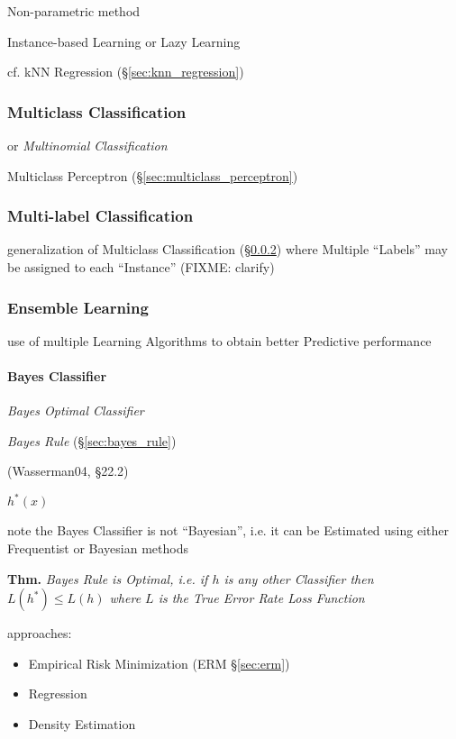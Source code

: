 Non-parametric method

Instance-based Learning or Lazy Learning

cf. kNN Regression (\S\ref{sec:knn_regression})



\subsubsection{Multiclass Classification}\label{sec:multiclass}

or \emph{Multinomial Classification}

Multiclass Perceptron (\S\ref{sec:multiclass_perceptron})



\subsubsection{Multi-label Classification}\label{sec:multiclass}

generalization of Multiclass Classification (\S\ref{sec:multiclass}) where
Multiple ``Labels'' may be assigned to each ``Instance'' (FIXME: clarify)



\subsubsection{Ensemble Learning}\label{sec:ensemble_learning}

use of multiple Learning Algorithms to obtain better Predictive performance



\paragraph{Bayes Classifier}\label{sec:bayes_classifier}\hfill

\emph{Bayes Optimal Classifier}

\emph{Bayes Rule} (\S\ref{sec:bayes_rule})

(Wasserman04, \S22.2)

$h^*(x)$

note the Bayes Classifier is not ``Bayesian'', i.e. it can be Estimated using
either Frequentist or Bayesian methods

\textbf{Thm.} \emph{Bayes Rule is Optimal, i.e. if $h$ is any other Classifier
  then $L(h^*) \leq L(h)$ where $L$ is the True Error Rate Loss Function}

approaches:
\begin{itemize}
  \item Empirical Risk Minimization (ERM \S\ref{sec:erm})
  \item Regression
  \item Density Estimation
\end{itemize}

